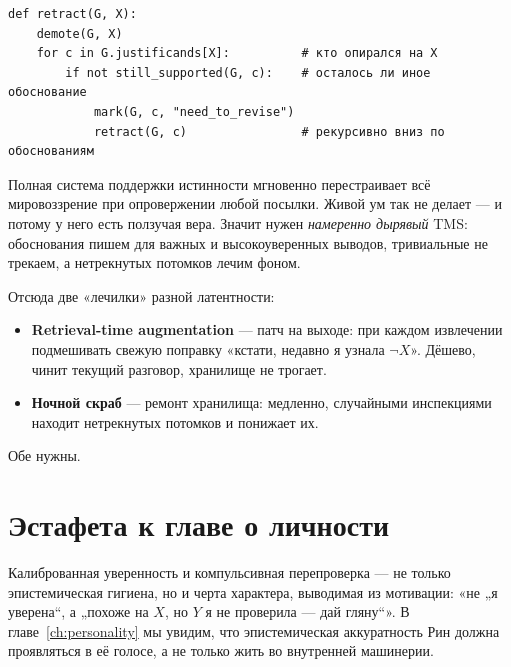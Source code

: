 \begin{lstlisting}[style=pseudo]
def retract(G, X):
    demote(G, X)
    for c in G.justificands[X]:          # кто опирался на X
        if not still_supported(G, c):    # осталось ли иное обоснование
            mark(G, c, "need_to_revise")
            retract(G, c)                # рекурсивно вниз по обоснованиям
\end{lstlisting}

\begin{intuition}
Полная система поддержки истинности мгновенно перестраивает всё мировоззрение
при опровержении любой посылки. Живой ум так не делает --- и потому у него
есть ползучая вера. Значит нужен \emph{намеренно дырявый} TMS: обоснования
пишем для важных и высокоуверенных выводов, тривиальные не трекаем, а
нетрекнутых потомков лечим фоном.
\end{intuition}

Отсюда две «лечилки» разной латентности:
\begin{itemize}
\item \textbf{Retrieval-time augmentation} --- патч на выходе: при каждом
извлечении подмешивать свежую поправку «кстати, недавно я узнала $\neg X$».
Дёшево, чинит текущий разговор, хранилище не трогает.
\item \textbf{Ночной скраб} --- ремонт хранилища: медленно, случайными
инспекциями находит нетрекнутых потомков и понижает их.
\end{itemize}
Обе нужны.

\section{Эстафета к главе о личности}

Калиброванная уверенность и компульсивная перепроверка --- не только
эпистемическая гигиена, но и черта характера, выводимая из мотивации:
«не „я уверена“, а „похоже на $X$, но $Y$ я не проверила --- дай гляну“».
В главе~\ref{ch:personality} мы увидим, что эпистемическая аккуратность Рин
должна проявляться в её голосе, а не только жить во внутренней машинерии.
